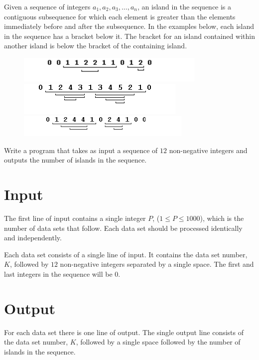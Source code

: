 
Given a sequence of integers $a_1, a_2, a_3, \ldots, a_n$, an island in the
sequence is a contiguous subsequence for which each element is greater
than the elements immediately before and after the subsequence.  In the
examples below, each island in the sequence has a bracket below it.
The bracket for an island contained within another island is below the
bracket of the containing island.

\begin{figure}[!h]
\begin{center}
\includegraphics[]{b1.png} \\
\includegraphics[]{b2.png} \\
\includegraphics[]{b3.png} \\
\end{center}
\end{figure}

Write a program that takes as input a sequence of $12$ non-negative
integers and outputs the number of islands in the sequence.

\section*{Input}

The first line of input contains a single integer $P$, ($1 \le P \le 1000$),
which is the number of data sets that follow.  Each data set should be
processed identically and independently.

Each data set consists of a single line of input.  It contains the
data set number, $K$, followed by $12$ non-negative integers separated by
a single space.  The first and last integers in the sequence will be 0.


\section*{Output}

For each data set there is one line of output.  The single output line
consists of the data set number, $K$, followed by a single space followed
by the number of islands in the sequence.
